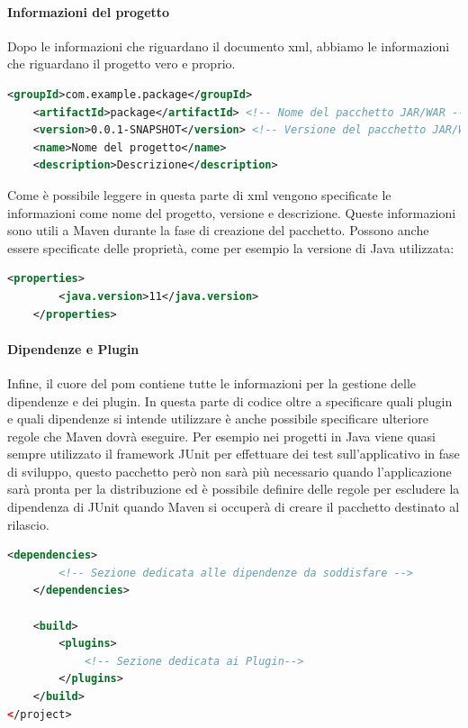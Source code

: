 \paragraph{Informazioni del progetto}
Dopo le informazioni che riguardano il documento xml, abbiamo le informazioni che riguardano il progetto vero e proprio. 
\begin{lstlisting}[language=XML, caption= Informazioni del progetto che Maven deve gestire]
	<groupId>com.example.package</groupId>
	<artifactId>package</artifactId> <!-- Nome del pacchetto JAR/WAR -->
	<version>0.0.1-SNAPSHOT</version> <!-- Versione del pacchetto JAR/WAR -->
	<name>Nome del progetto</name>
	<description>Descrizione</description>
\end{lstlisting}
Come è possibile leggere in questa parte di xml vengono specificate le informazioni come nome del progetto, versione e descrizione. Queste informazioni sono utili a Maven durante la fase di creazione del pacchetto. Possono anche essere specificate delle proprietà, come per esempio la versione di Java utilizzata:
\begin{lstlisting}[language=XML, caption= Specifica della versione di Java]
	<properties>
		<java.version>11</java.version>
	</properties>
\end{lstlisting}


\paragraph{Dipendenze e Plugin}
Infine, il cuore del pom contiene tutte le informazioni per la gestione delle dipendenze e dei plugin. In questa parte di codice oltre a specificare quali plugin e quali dipendenze si intende utilizzare è anche possibile specificare ulteriore regole che Maven dovrà eseguire. Per esempio nei progetti in Java viene quasi sempre utilizzato il framework JUnit per effettuare dei test sull'applicativo in fase di sviluppo, questo pacchetto però non sarà più necessario quando l'applicazione sarà pronta per la distribuzione ed è possibile definire delle regole per escludere la dipendenza di JUnit quando Maven si occuperà di creare il pacchetto destinato al rilascio.
\begin{lstlisting}[language=XML, caption=Dipendenze e Plugin nel POM]
	<dependencies>
		<!-- Sezione dedicata alle dipendenze da soddisfare -->
	</dependencies>

	<build>
		<plugins>
			<!-- Sezione dedicata ai Plugin-->
		</plugins>
	</build>
</project>
\end{lstlisting}


